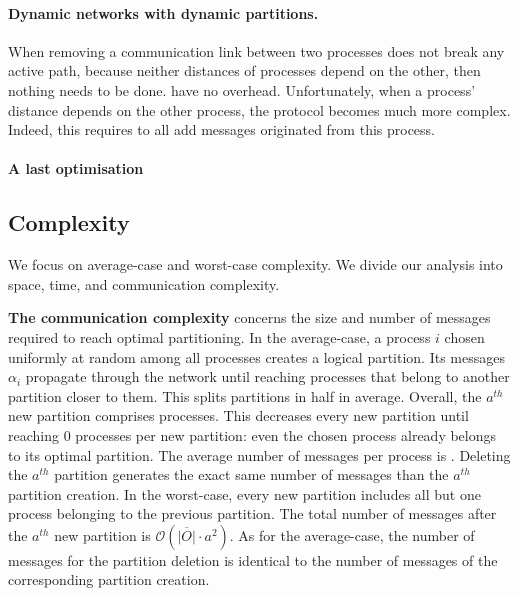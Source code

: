 \paragraph{Dynamic networks with dynamic partitions.}
When removing a communication link between two processes does not
break any active path, because neither distances of processes depend
on the other, then nothing needs to be done. \NAME have no overhead.
Unfortunately, when a process' distance depends on the other process,
the protocol becomes much more complex. Indeed, this requires to
 all add messages originated from this process.   

\paragraph{A last optimisation}


\subsection{Complexity}
\label{subsec:complexity}


We focus on average-case and worst-case complexity. We divide our
analysis into space, time, and communication complexity.

\textbf{The communication complexity} concerns the size and number of
messages required to reach optimal partitioning. In the average-case,
a process $i$ chosen uniformly at random among all processes creates a
logical partition. Its messages $\alpha_i$ propagate through the
network until reaching processes that belong to another partition
closer to them. This splits partitions in half in average. Overall,
the $a^{th}$ new partition comprises
processes. This decreases every new partition until reaching $0$
processes per new partition: even the chosen process already belongs
to its optimal partition. The average number of messages per process
is .  Deleting the
$a^{th}$ partition generates the exact same number of messages than
the $a^{th}$ partition creation.  In the
worst-case, every new partition includes all but one process belonging
to the previous partition. The total number of messages after the
$a^{th}$ new partition is $\mathcal{O}(\overline{|O|}\cdot a^2)$. As
for the average-case, the number of messages for the partition
deletion is identical to the number of messages of the corresponding
partition creation.

